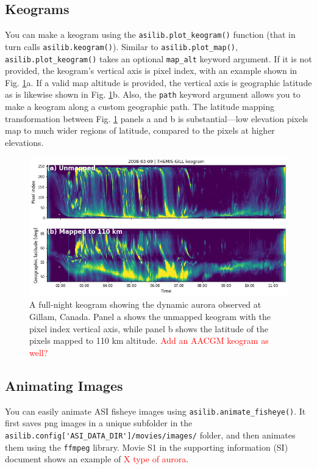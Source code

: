 \documentclass[draft]{agujournal2019}
\begin{document}
\subsection{Keograms}
You can make a keogram using the \verb|asilib.plot_keogram()| function (that in turn calls \verb|asilib.keogram()|). Similar to \verb|asilib.plot_map()|, \verb|asilib.plot_keogram()| takes an optional \verb|map_alt| keyword argument. If it is not provided, the keogram's vertical axis is pixel index, with an example shown in Fig. \ref{fig3}a. If a valid map altitude is provided, the vertical axis is geographic latitude as is likewise shown in Fig. \ref{fig3}b. Also, the \verb|path| keyword argument allows you to make a keogram along a custom geographic path. The latitude  mapping transformation between Fig. \ref{fig3} panels a and b is substantial---low elevation pixels map to much wider regions of latitude, compared to the pixels at higher elevations.

\begin{figure}
      \includegraphics[width=\textwidth]{figures/fig3.png}
      \caption{A full-night keogram showing the dynamic aurora observed at Gillam, Canada. Panel a shows the unmapped keogram with the pixel index vertical axis, while panel b shows the latitude of the pixels mapped to 110 km altitude. \textcolor{red}{Add an AACGM keogram as well?}}
      \label{fig3}
\end{figure}


\subsection{Animating Images}
You can easily animate ASI fisheye images using \verb|asilib.animate_fisheye()|. It first saves png images in a unique subfolder in the \verb|asilib.config['ASI_DATA_DIR']/movies/images/| folder, and then animates them using the \verb|ffmpeg| \cite{ffmpeg} library. Movie S1 in the supporting information (SI) document shows an example of \textcolor{red}{X type of aurora}.
\end{document}
